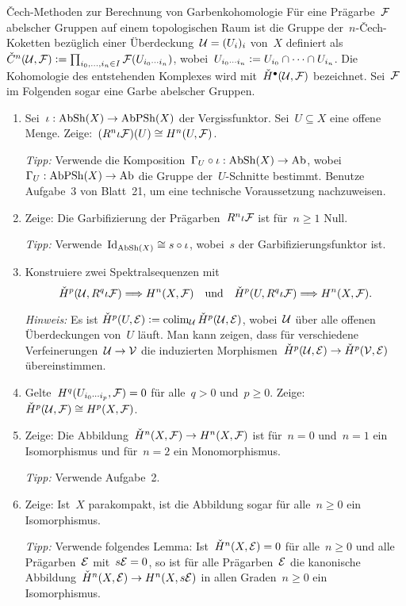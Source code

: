 \documentclass{uebblatt}
\begin{document}

\begin{aufgabe}{Čech-Methoden zur Berechnung von Garbenkohomologie}
Für eine Prägarbe~$\mathcal{F}$ abelscher Gruppen auf einem topologischen Raum ist die
Gruppe der~$n$-Čech-Koketten bezüglich einer Überdeckung~$\mathcal{U} = (U_i)_i$ von~$X$
definiert als~$\check C^n(\mathcal{U}, \mathcal{F}) \vcentcolon= \prod_{i_0,\ldots,i_n \in I}
\mathcal{F}(U_{i_0 \cdots i_n})$, wobei~$U_{i_0 \cdots i_n} \vcentcolon= U_{i_0} \cap \cdots
\cap U_{i_n}$. Die Kohomologie des entstehenden Komplexes wird mit~$\check
H^\bullet(\mathcal{U}, \mathcal{F})$ bezeichnet. Sei~$\mathcal{F}$ im Folgenden sogar eine Garbe abelscher Gruppen.
\begin{enumerate}
\item Sei~$\iota : \mathrm{AbSh}(X) \to
\mathrm{AbPSh}(X)$ der Vergissfunktor. Sei~$U \subseteq X$ eine offene Menge.
Zeige:~$(R^n \iota\mathcal{F})(U) \cong H^n(U, \mathcal{F})$.

{\tiny\emph{Tipp:} Verwende die Komposition~$\Gamma_U
\circ \iota : \mathrm{AbSh}(X) \to \mathrm{Ab}$, wobei~$\Gamma_U : \mathrm{AbPSh}(X) \to \mathrm{Ab}$ die
Gruppe der~$U$-Schnitte bestimmt. Benutze Aufgabe~3 von Blatt~21, um eine
technische Voraussetzung nachzuweisen.\par}
\item Zeige: Die Garbifizierung der Prägarben~$R^n \iota \mathcal{F}$ ist für~$n \geq 1$
Null.

{\tiny\emph{Tipp:} Verwende~$\mathrm{Id}_{\mathrm{AbSh}(X)} \cong s \circ \iota$, wobei~$s$ der Garbifizierungsfunktor
ist.\par}
\item Konstruiere zwei Spektralsequenzen mit
\[ \check H^p(\mathcal{U}, R^q \iota \mathcal{F}) \Longrightarrow H^n(X, \mathcal{F})
  \quad\text{und}\quad
  \check H^p(U, R^q \iota \mathcal{F}) \Longrightarrow H^n(X, \mathcal{F}). \]
{\tiny\emph{Hinweis:} Es ist $\check H^p(U,\mathcal{E}) \vcentcolon= \operatorname{colim}_{\mathcal{U}} \check H^p(\mathcal{U},\mathcal{E})$,
wobei~$\mathcal{U}$ über alle offenen Überdeckungen von~$U$ läuft. Man kann zeigen, dass
für verschiedene Verfeinerungen~$\mathcal{U} \to \mathcal{V}$ die induzierten
Morphismen~$\check H^p(\mathcal{U},\mathcal{E}) \to \check H^p(\mathcal{V},\mathcal{E})$ übereinstimmen.\par}
\item Gelte~$H^q(U_{i_0 \cdots i_p}, \mathcal{F}) = 0$ für alle~$q > 0$ und~$p \geq 0$.
Zeige: $\check H^p(\mathcal{U}, \mathcal{F}) \cong H^p(X, \mathcal{F})$.
\item Zeige: Die Abbildung~$\check H^n(X,\mathcal{F}) \to H^n(X,\mathcal{F})$ ist für~$n = 0$
und~$n = 1$ ein Isomorphismus und für~$n = 2$ ein Monomorphismus.
{\tiny\emph{Tipp:} Verwende Aufgabe~2.\par}
\item Zeige: Ist~$X$ parakompakt, ist die Abbildung sogar für alle~$n \geq 0$ ein
Isomorphismus.

{\tiny\emph{Tipp:} Verwende folgendes Lemma: Ist~$\check H^n(X,\mathcal{E}) = 0$ für
alle~$n \geq 0$ und alle Prägarben~$\mathcal{E}$ mit~$s\mathcal{E} = 0$, so ist für alle
Prägarben~$\mathcal{E}$ die kanonische Abbildung~$\check H^n(X,\mathcal{E}) \to H^n(X,s\mathcal{E})$ in
allen Graden~$n \geq 0$ ein Isomorphismus.\par}
\end{enumerate}
\end{aufgabe}
\end{document}
